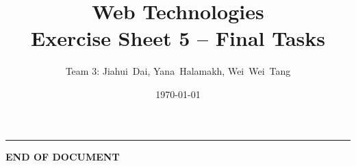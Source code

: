 \documentclass[a4paper,12pt]{article} %
\title{Web Technologies \\
        \large{Exercise Sheet 5 -- Final Tasks}} %
\author{Team 3: Jiahui~Dai, Yana~Halamakh, Wei~Wei~Tang} %
\date{\today} %
\begin{document}
\maketitle %
\hrule %
\tableofcontents %
\newpage












\begin{center}
    \vspace{5em}
    \textbf{END OF DOCUMENT}
\end{center}
\end{document}
